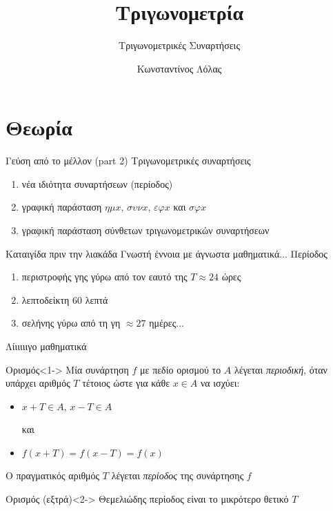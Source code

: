 \documentclass{../presentation}
\title{Τριγωνομετρία}
\subtitle{Τριγωνομετρικές Συναρτήσεις}
\author[Λόλας]{Κωνσταντίνος Λόλας}
\date{}
\begin{document}
\begin{frame}
  \titlepage
\end{frame}

\section{Θεωρία}
\begin{frame}{Γεύση από το μέλλον (part 2)}
  Τριγωνομετρικές συναρτήσεις
  \begin{enumerate}
    \item<1-> νέα ιδιότητα συναρτήσεων (περίοδος)
    \item<2-> γραφική παράσταση $ημx$, $συνx$, $εφx$ και $σφx$
    \item<3-> γραφική παράσταση σύνθετων τριγωνομετρικών συναρτήσεων
  \end{enumerate}
\end{frame}

\begin{frame}{Καταιγίδα πριν την λιακάδα}
  Γνωστή έννοια με άγνωστα μαθηματικά... Περίοδος
  \begin{enumerate}
    \item<1-> περιστροφής γης γύρω από τον εαυτό της $T\approx 24$ ώρες
    \item<2-> λεπτοδείκτη $60$ λεπτά
    \item<3-> σελήνης γύρω από τη γη $\approx 27$ ημέρες...
  \end{enumerate}
\end{frame}

\begin{frame}{Λίιιιιιγο μαθηματικά}
  \begin{block}{Ορισμός}<1->
    Μία συνάρτηση $f$ με πεδίο ορισμού το $Α$ λέγεται \emph{περιοδική}, όταν υπάρχει αριθμός $Τ$ τέτοιος ώστε για κάθε $x\in Α$ να ισχύει:
    \begin{itemize}
      \item $x+Τ\in Α$, $x-Τ\in Α$

            και

      \item $f(x+Τ)=f(x-Τ)=f(x)$
    \end{itemize}
    Ο πραγματικός αριθμός $Τ$ λέγεται \emph{περίοδος} της συνάρτησης $f$
  \end{block}

  \begin{block}{Ορισμός (εξτρά)}<2->
    Θεμελιώδης περίοδος είναι το μικρότερο θετικό $Τ$
  \end{block}

\end{frame}
\end{document}
